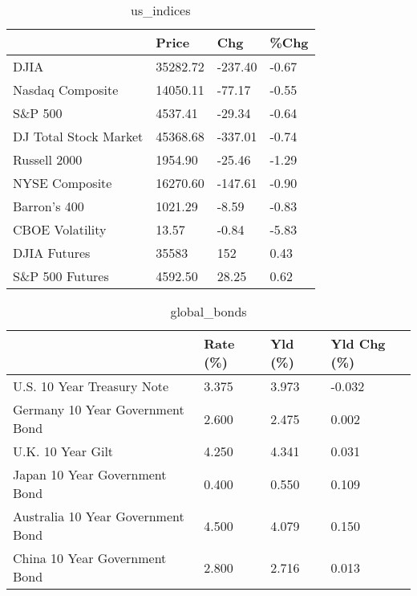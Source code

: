 \documentclass{article}%
\begin{document}
%


\begin{table}[htbp]%
\caption{us\_indices}%
\centering%
\begin{adjustbox}{width=1\textwidth}%
\begin{tabular}{llll}
\toprule
                      &    Price &     Chg &  \%Chg \\
\midrule
                 DJIA & 35282.72 & -237.40 & -0.67 \\
     Nasdaq Composite & 14050.11 &  -77.17 & -0.55 \\
              S\&P 500 &  4537.41 &  -29.34 & -0.64 \\
DJ Total Stock Market & 45368.68 & -337.01 & -0.74 \\
         Russell 2000 &  1954.90 &  -25.46 & -1.29 \\
       NYSE Composite & 16270.60 & -147.61 & -0.90 \\
         Barron's 400 &  1021.29 &   -8.59 & -0.83 \\
      CBOE Volatility &    13.57 &   -0.84 & -5.83 \\
         DJIA Futures &    35583 &     152 &  0.43 \\
      S\&P 500 Futures &  4592.50 &   28.25 &  0.62 \\
\bottomrule
\end{tabular}
%
\end{adjustbox}%
\end{table}

%


\begin{table}[htbp]%
\caption{global\_bonds}%
\centering%
\begin{adjustbox}{width=1\textwidth}%
\begin{tabular}{llll}
\toprule
                                  & Rate (\%) & Yld (\%) & Yld Chg (\%) \\
\midrule
       U.S. 10 Year Treasury Note &    3.375 &   3.973 &      -0.032 \\
  Germany 10 Year Government Bond &    2.600 &   2.475 &       0.002 \\
                U.K. 10 Year Gilt &    4.250 &   4.341 &       0.031 \\
    Japan 10 Year Government Bond &    0.400 &   0.550 &       0.109 \\
Australia 10 Year Government Bond &    4.500 &   4.079 &       0.150 \\
    China 10 Year Government Bond &    2.800 &   2.716 &       0.013 \\
\bottomrule
\end{tabular}
%
\end{adjustbox}%
\end{table}
\end{document}
